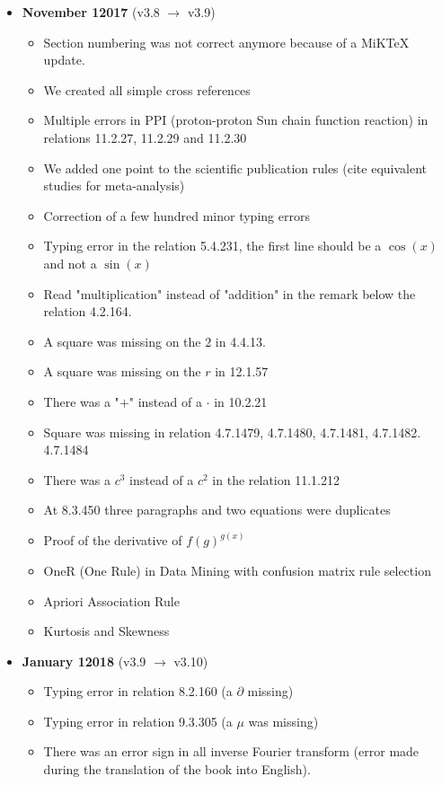 \begin{itemize}
\begin{itemize}[noitemsep]
		\end{itemize}
	\item \textbf{November 12017} (v3.8 $\rightarrow$ v3.9)
		\begin{itemize}[noitemsep]
			\item Section numbering was not correct anymore because of a MiKTeX update.
			\item We created all simple cross references
			\item Multiple errors in PPI (proton-proton Sun chain function reaction) in relations 11.2.27, 11.2.29 and 11.2.30
			\item We added one point to the scientific publication rules (cite equivalent studies for meta-analysis)
			\item Correction of a few hundred minor typing errors
			\item Typing error in the relation 5.4.231, the first line should be a $\cos(x)$ and not a $\sin(x)$
			\item Read "multiplication" instead of "addition" in the remark below the relation 4.2.164.
			\item A square was missing on the $2$ in 4.4.13.
			\item A square was missing on the $r$ in 12.1.57
			\item There was a "$+$" instead of a $\cdot$ in 10.2.21
			\item Square was missing in relation 4.7.1479, 4.7.1480, 4.7.1481, 4.7.1482. 4.7.1484
			\item There was a $c^3$ instead of a $c^2$ in the relation 11.1.212
			\item At 8.3.450 three paragraphs and two equations were duplicates
			\item Proof of the derivative of $f(g)^{g(x)}$
			\item OneR (One Rule) in Data Mining with confusion matrix rule selection
			\item Apriori Association Rule
			\item Kurtosis and Skewness
		\end{itemize}
	\item \textbf{January 12018} (v3.9 $\rightarrow$ v3.10)
		\begin{itemize}[noitemsep]
			\item Typing error in relation 8.2.160 (a $\partial$ missing)
			\item Typing error in relation 9.3.305 (a $\mu$ was missing)
			\item There was an error sign in all inverse Fourier transform (error made during the translation of the book into English).

\end{itemize}
\end{itemize}
